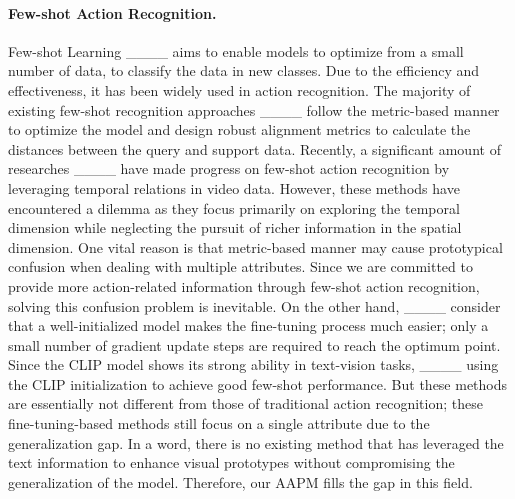 \paragraph{Few-shot Action Recognition.}
Few-shot Learning ____ aims to enable models to optimize from a small number of data, to classify the data in new classes. Due to the efficiency and effectiveness, it has been widely used in action recognition. The majority of existing few-shot recognition approaches ____ follow the metric-based manner to optimize the model and design robust alignment metrics to calculate the distances between the query and support data. 
Recently, a significant amount of researches ____ have made progress on few-shot action recognition by leveraging temporal relations in video data. However, these methods have encountered a dilemma as they focus primarily on exploring the temporal dimension while neglecting the pursuit of richer information in the spatial dimension. 
One vital reason is that metric-based manner may cause prototypical confusion when dealing with multiple attributes. Since we are committed to provide more action-related information through few-shot action recognition, solving this confusion problem is inevitable.
On the other hand, ____ consider that a well-initialized model makes the fine-tuning process much easier; only a small number of gradient update steps are required to reach the optimum point. Since the CLIP model shows its strong ability in text-vision tasks, ____ using the CLIP initialization to achieve good few-shot performance. But these methods are essentially not different from those of traditional action recognition; these fine-tuning-based methods still focus on a single attribute due to the generalization gap. In a word, there is no existing method that has leveraged the text information to enhance visual prototypes without compromising the generalization of the model. Therefore, our AAPM fills the gap in this field.


